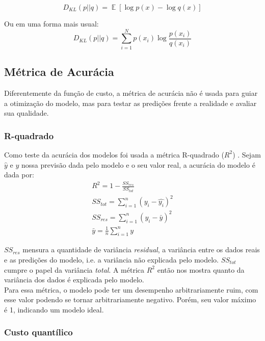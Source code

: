 \[D_{KL}(p || q) = \mathop{\mathbb{E}}[\log p(x) - \log q(x)]​\]

Ou em uma forma mais usual: \\

\[D_{KL}(p||q) = \sum_{i=1}^{N}p(x_{i}) \log \frac{p(x_{i})}{q(x_{i})}​\]



\subsection{Métrica de Acurácia}

Diferentemente da função de custo, a métrica de acurácia não é usada para guiar a otimização do modelo,
mas para testar as predições frente a realidade e avaliar sua qualidade. \\

\subsubsection{R-quadrado}
Como teste da acurácia dos modelos foi usada a métrica R-quadrado ($R^2$) \citep{cohen}. Sejam $\hat{y}$ e $y$ nossa previsão dada pelo modelo e o seu valor real, a acurácia do modelo é dada por:\\

\begin{align}
&R^2 = 1 - \frac{SS_{res}}{SS_{tot}} &\\
&SS_{tot} = \sum^n_{i=1} (y_i- \hat{y_i})^2 &\\
&SS_{res} = \sum^n_{i=1} (y_i - \bar{y})^2 &\\
&\bar{y} = \frac{1}{n} \sum^n_{i=1} y &
\end{align}

$SS_{res}$ mensura a quantidade de variância \textit{residual}, a
variância entre os dados reais e as predições do modelo, i.e. a variância não
explicada pelo modelo. $SS_{tot}$ cumpre o papel da variância \textit{total}. A métrica $R^2$
então nos mostra quanto da variância dos dados é explicada pelo modelo. \\

Para essa métrica, o modelo pode ter um desempenho arbitrariamente ruim, com esse valor
podendo se tornar arbitrariamente negativo. Porém, seu valor máximo é 1,
indicando um modelo ideal.\\


\subsubsection{Custo quantílico}

